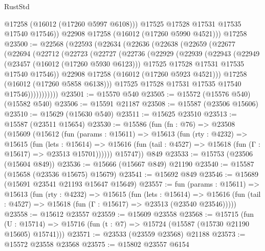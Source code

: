 \begin{lexlean}{RustStd}
\begin{coremodule}
            @17258
            (@16012 (@17260 @5997 @6108)))
          @17525
          @17528
          @17531
          @17535
          @17540
          @17546))
      @22908
      @17258
      (@16012 (@17260 @5990 @4521)))
    @17258
@23500 := @22568
    (@22593
      (@22634
        (@22636
          (@22638
            (@22659
              (@22677
                (@22694
                  (@22712
                    (@22723
                      (@22727
                        (@22736
                          (@22929
                            (@22939
                              (@22943
                                (@22949
                                  (@23457 (@16012 (@17260 @5930 @6123)))
                                  @17525
                                  @17528
                                  @17531
                                  @17535
                                  @17540
                                  @17546))
                              @22908
                              @17258
                              (@16012 (@17260 @5923 @4521)))
                            @17258
                            (@16012 (@17260 @5858 @6138)))
                          @17525
                          @17528
                          @17531
                          @17535
                          @17540
                          @17546)))))))))))
@23501 := @15570 @540
@23505 := @15572 (@15576 @540) (@15582 @540)
@23506 := @15591 @21187
@23508 := @15587 (@23506 @15606)
@23510 := @15629 (@15630 @540)
@23511 := @15625 @23510
@23513 := @15587 (@23511 @15654)
@23530 := @15586
    (fun (fn : @76) =>
    @23508
      (@15609
        (@15612
          (fun (params : @15611) =>
          @15613
            (fun (rty : @4232) =>
            @15615
              (fun (lets : @15614) =>
              @15616 (fun (tail : @4527) => @15618 (fun (Γ : @15617) => @23513 @15701))))))
        @15747))
    @849
@23533 := @15753 (@23506 (@15604 @849))
@23536 := @15666 (@15667 @849) @21190
@23540 := @15587 (@15658 (@23536 @15675) @15679)
@23541 := @15692 @849
@23546 := @15689 (@15691 @23541 @21193 @15647 @15649)
@23557 := fun (params : @15611) =>
  @15613
    (fun (rty : @4232) =>
    @15615
      (fun (lets : @15614) =>
      @15616 (fun (tail : @4527) => @15618 (fun (Γ : @15617) => @23513 (@23540 @23546)))))
@23558 := @15612 @23557
@23559 := @15609 @23558
@23568 := @15715
    (fun (U : @15714) => @15716 (fun (t : @7) => @15724 (@15587 (@15730 @21190 @15605) @15741)))
@23571 := @23533 (@23559 @23568) @21188
@23573 := @15572 @23558 @23568
@23575 := @15802 @23557 @6154

\end{coremodule}
\end{lexlean}
